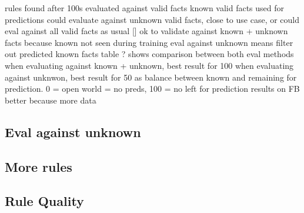 rules found after 100s evaluated against valid facts
known valid facts used for predictions
could evaluate against unknown valid facts, close to use case, or could eval against all valid facts as usual []
ok to validate against known + unknown facts because known not seen during training
eval against unknown means filter out predicted known facts
table ? shows comparison between both eval methods
when evaluating against known + unknown, best result for 100
when evaluating against unknwon, best result for 50 as balance between known and remaining for prediction. 0 = open world = no preds, 100 = no left for prediction
results on FB better because more data

\subsection{Eval against unknown}
\label{subsec:5_experiments/5_ruler/1_unknown}


\subsection{More rules}
\label{subsec:5_experiments/5_ruler/2_rule_count}


\subsection{Rule Quality}
\label{subsec:5_experiments/5_ruler/3_rule_quality}

